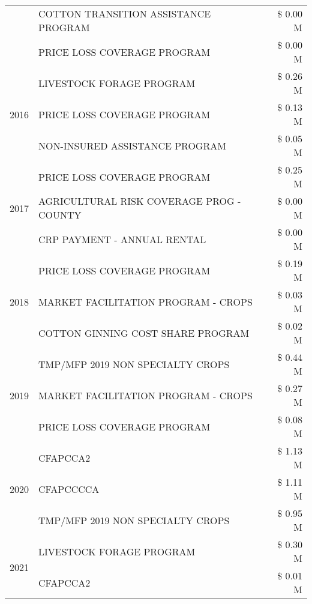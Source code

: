 \begin{tabular}{llr}
 & COTTON TRANSITION ASSISTANCE PROGRAM & \$ 0.00 M \\
 & PRICE LOSS COVERAGE PROGRAM & \$ 0.00 M \\
\cline{1-3}
\multirow[t]{3}{*}{2016} & LIVESTOCK FORAGE PROGRAM & \$ 0.26 M \\
 & PRICE LOSS COVERAGE PROGRAM & \$ 0.13 M \\
 & NON-INSURED ASSISTANCE PROGRAM & \$ 0.05 M \\
\cline{1-3}
\multirow[t]{3}{*}{2017} & PRICE LOSS COVERAGE PROGRAM & \$ 0.25 M \\
 & AGRICULTURAL RISK COVERAGE PROG - COUNTY & \$ 0.00 M \\
 & CRP PAYMENT - ANNUAL RENTAL & \$ 0.00 M \\
\cline{1-3}
\multirow[t]{3}{*}{2018} & PRICE LOSS COVERAGE PROGRAM & \$ 0.19 M \\
 & MARKET FACILITATION PROGRAM - CROPS & \$ 0.03 M \\
 & COTTON GINNING COST SHARE PROGRAM & \$ 0.02 M \\
\cline{1-3}
\multirow[t]{3}{*}{2019} & TMP/MFP 2019 NON SPECIALTY CROPS & \$ 0.44 M \\
 & MARKET FACILITATION PROGRAM - CROPS & \$ 0.27 M \\
 & PRICE LOSS COVERAGE PROGRAM & \$ 0.08 M \\
\cline{1-3}
\multirow[t]{3}{*}{2020} & CFAPCCA2 & \$ 1.13 M \\
 & CFAPCCCCA & \$ 1.11 M \\
 & TMP/MFP 2019 NON SPECIALTY CROPS & \$ 0.95 M \\
\cline{1-3}
\multirow[t]{2}{*}{2021} & LIVESTOCK FORAGE PROGRAM & \$ 0.30 M \\
 & CFAPCCA2 & \$ 0.01 M \\
\cline{1-3}
\bottomrule
\end{tabular}
